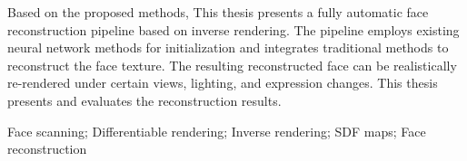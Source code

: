 \documentclass{scutmaster}
\newcommand{\changed}[1]{{\color{red}#1}}
\begin{document}
Based on the proposed methods, This thesis presents a fully automatic face reconstruction pipeline based on inverse rendering.
The pipeline employs existing neural network methods for initialization and integrates traditional methods to reconstruct the face texture.
The resulting reconstructed face can be realistically re-rendered under certain views, lighting, and expression changes.
This thesis presents and evaluates the reconstruction results.

 \changed{Face scanning}; Differentiable rendering; Inverse rendering; SDF maps; Face reconstruction

\tableofcontents

\listoffigures

\listoftables

\mainmatter









\end{document}
